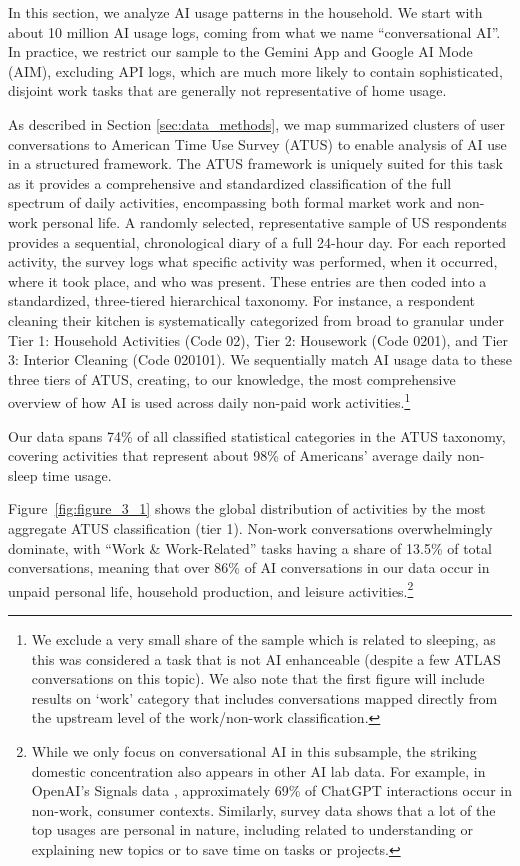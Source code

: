 \documentclass[11pt,a4paper]{article}
\begin{document}
In this section, we analyze AI usage patterns in the household. We start with about 10 million AI usage logs, coming from what we name ``conversational AI''. In practice, we restrict our sample to the Gemini App and Google AI Mode (AIM), excluding API logs, which are much more likely to contain sophisticated, disjoint work tasks that are generally not representative of home usage.

As described in Section \ref{sec:data_methods}, we map summarized clusters of user conversations to American Time Use Survey (ATUS) \citep{bls_atus_lexicon_2024} to enable analysis of AI use in a structured framework. The ATUS framework is uniquely suited for this task as it provides a comprehensive and standardized classification of the full spectrum of daily activities, encompassing both formal market work and non-work personal life. A randomly selected, representative sample of US respondents provides a sequential, chronological diary of a full 24-hour day. For each reported activity, the survey logs what specific activity was performed, when it occurred, where it took place, and who was present. These entries are then coded into a standardized, three-tiered hierarchical taxonomy. For instance, a respondent cleaning their kitchen is systematically categorized from broad to granular under Tier 1: Household Activities (Code 02), Tier 2: Housework (Code 0201), and Tier 3: Interior Cleaning (Code 020101). We sequentially match AI usage data to these three tiers of ATUS, creating, to our knowledge, the most comprehensive overview of how AI is used across daily non-paid work activities.\footnote{We exclude a very small share of the sample which is related to sleeping, as this was considered a task that is not AI enhanceable (despite a few ATLAS conversations on this topic). We also note that the first figure will include results on `work' category that includes conversations mapped directly from the upstream level of the work/non-work classification.}

Our data spans 74\% of all classified statistical categories in the ATUS taxonomy, covering activities that represent about 98\% of Americans' average daily non-sleep time usage.

Figure~\ref{fig:figure_3_1} shows the global distribution of activities by the most aggregate ATUS classification (tier 1). Non-work conversations overwhelmingly dominate, with ``Work \& Work-Related'' tasks having a share of 13.5\% of total conversations, meaning that over 86\% of AI conversations in our data occur in unpaid personal life, household production, and leisure activities.\footnote{While we only focus on conversational AI in this subsample, the striking domestic concentration also appears in other AI lab data. For example, in OpenAI's Signals data \citep{NBERw34255}, approximately 69\% of ChatGPT interactions occur in non-work, consumer contexts. Similarly, \cite{ipsos_google_2026_ai_survey} survey data shows that a lot of the top usages are personal in nature, including related to understanding or explaining new topics or to save time on tasks or projects.}
\end{document}
